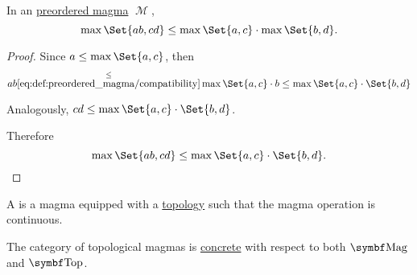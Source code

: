 \begin{proposition}\label{thm:preordered_magma_max_distributivity}
  In an \hyperref[def:preordered_magma]{preordered magma} \( \mscrM \),
  \begin{equation}\label{eq:thm:preordered_magma_max_distributivity}
    \max \Set{a b, c d} \leq \max \Set{a, c} \cdot \max \Set{b, d}.
  \end{equation}
\end{proposition}
\begin{proof}
  Since \( a \leq \max \Set{a, c} \), then
  \begin{equation*}
    ab
    \overset \leq {\eqref{eq:def:preordered_magma/compatibility}}
    \max \Set{a, c} \cdot b
    \leq
    \max \Set{a, c} \cdot \Set{b, d}
  \end{equation*}

  Analogously, \( cd \leq \max \Set{a, c} \cdot \Set{b, d} \).

  Therefore
  \begin{equation}
    \max \Set{a b, c d} \leq \max \Set{a, c} \cdot \Set{b, d}.
  \end{equation}
\end{proof}

\begin{definition}\label{def:topological_magma}
  A  is a magma equipped with a \hyperref[def:topological_space]{topology} such that the magma operation is continuous.

  The category of topological magmas is \hyperref[def:concrete_category]{concrete} with respect to both \( \Cat{Mag} \) and \hyperref[def:category_of_topological_spaces]{\( \Cat{Top} \)}.
\end{definition}
